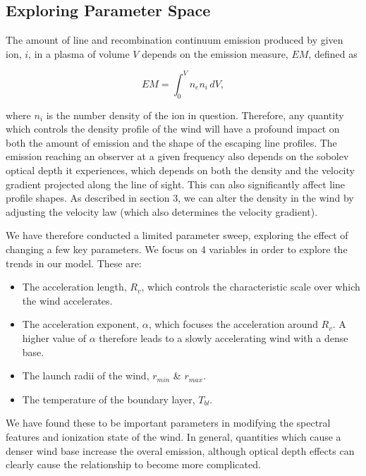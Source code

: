 \documentclass[preprint, a4paper, 11pt]{aastex}
\begin{document}
\subsection{Exploring Parameter Space}

The amount of line and recombination continuum
emission produced by given ion, $i$, in a plasma of volume $V$
depends on the emission measure, $EM$, defined as

\begin{equation}
EM=\int^V_0 n_e n_i \,dV,
\end{equation}

where $n_i$ is the number density of the ion in question.    
Therefore, any quantity which controls the density profile of the wind
will have a profound impact on both the 
amount of emission and the shape of the escaping line profiles.
The emission reaching an observer at a given frequency
also depends on the sobolev optical depth it experiences, which depends on both
the density and the velocity gradient projected
along the line of sight. This can also significantly affect line profile shapes.       
As described in section 3, we can alter the density in the wind by 
adjusting the velocity law (which also determines the velocity gradient). 

We have therefore conducted a limited parameter 
sweep, exploring the effect of changing a few key parameters.  We focus on 
4 variables in order to explore the trends in our model. These are:

\begin{itemize}
 	\item  The acceleration length, $R_v$, which controls the characteristic scale
 	over which the wind accelerates.
 	\item The acceleration exponent, $\alpha$, which focuses the acceleration
 	around $R_v$. A higher value of $\alpha$ therefore leads to a slowly accelerating 
 	wind with a dense base.
 	\item The launch radii of the wind, $r_{min}$ \& $r_{max}$.
 	\item The temperature of the boundary layer, $T_{bl}$.
 \end{itemize} 

We have found these to be important parameters in modifying 
the spectral features and ionization state of the wind.
In general, quantities which cause a denser wind base increase
the overal emission, although optical depth effects can clearly cause 
the relationship to become more complicated. 
\end{document}
